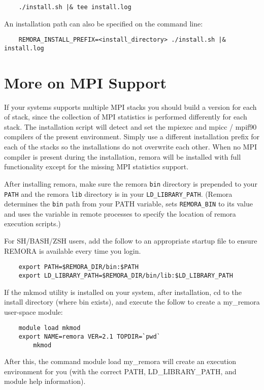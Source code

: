 \documentclass[10pt,a4paper]{report}
\begin{document}
\begin{verbatim}
    ./install.sh |& tee install.log
\end{verbatim}

An installation path can also be specified on the command line:
\begin{verbatim}
    REMORA_INSTALL_PREFIX=<install_directory> ./install.sh |& install.log
\end{verbatim}

\section{More on MPI Support}
If your systems supports multiple MPI stacks you should build a version 
for each of stack, since the collection of MPI statistics is performed differently for each stack.
The installation script will detect and set the mpiexec and 
mpicc / mpif90 compilers of the present environment.
Simply use a different installation prefix for each of the 
stacks so the installations do not overwrite each other. 
When no MPI compiler is present during the installation, remora will be installed with 
full functionality except for the missing MPI statistics support.

After installing remora, make sure the remora \verb+bin+ directory is prepended to your \verb+PATH+ 
and the remora \verb+lib+ directory is in your \verb|LD_LIBRARY_PATH|. 
(Remora determines the \verb+bin+ path from your PATH variable, sets \verb|REMORA_BIN| to its 
value and uses the variable in remote processes to specify the location of remora execution scripts.) 

For SH/BASH/ZSH users, add the follow to an appropriate startup file to ensure REMORA 
is available every time you login. 
\begin{verbatim}
	export PATH=$REMORA_DIR/bin:$PATH
	export LD_LIBRARY_PATH=$REMORA_DIR/bin/lib:$LD_LIBRARY_PATH
\end{verbatim}

If the mkmod utility is installed on your system, after installation, cd to the install
directory (where bin exists), and execute the follow to create a my\_remora user-space module:
\begin{verbatim}
	module load mkmod 
	export NAME=remora VER=2.1 TOPDIR=`pwd` 
        mkmod
\end{verbatim}
After this, the command module load my\_remora will create an execution environment for you
(with the correct PATH, LD\_LIBRARY\_PATH, and module help information).
\end{document}
